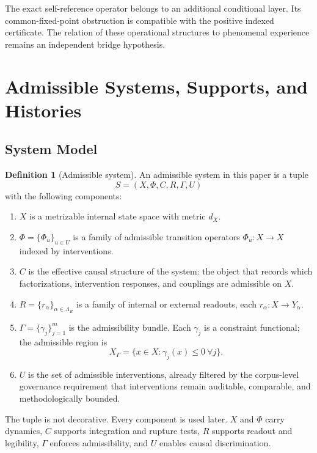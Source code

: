 \documentclass[11pt,a4paper]{article}
\theoremstyle{definition}
\newtheorem{definition}[theorem]{Definition}
\begin{document}
The exact self-reference operator belongs to an additional conditional layer.
Its common-fixed-point obstruction is compatible with the positive indexed
certificate. The relation of these operational structures to phenomenal
experience remains an independent bridge hypothesis.

\section{Admissible Systems, Supports, and Histories}
\subsection{System Model}
\begin{definition}[Admissible system]\label{def:system}
An admissible system in this paper is a tuple
\[
S = (X,\Phi,C,R,\Gamma,U)
\]
with the following components:
\begin{enumerate}[leftmargin=1.5em]
\item $X$ is a metrizable internal state space with metric $d_X$.
\item $\Phi = \{\Phi_u\}_{u \in U}$ is a family of admissible transition operators $\Phi_u : X \to X$ indexed by interventions.
\item $C$ is the effective causal structure of the system: the object that records which factorizations, intervention responses, and couplings are admissible on $X$.
\item $R = \{r_\alpha\}_{\alpha \in \Lambda_R}$ is a family of internal or external readouts, each $r_\alpha : X \to Y_\alpha$.
\item $\Gamma = \{\gamma_j\}_{j=1}^m$ is the admissibility bundle. Each $\gamma_j$ is a constraint functional; the admissible region is
\[
X_\Gamma = \{x \in X : \gamma_j(x) \le 0 \ \forall j\}.
\]
\item $U$ is the set of admissible interventions, already filtered by the corpus-level governance requirement that interventions remain auditable, comparable, and methodologically bounded.
\end{enumerate}
\end{definition}

The tuple is not decorative. Every component is used later. $X$ and $\Phi$ carry dynamics, $C$ supports integration and rupture tests, $R$ supports readout and legibility, $\Gamma$ enforces admissibility, and $U$ enables causal discrimination.
\end{document}
